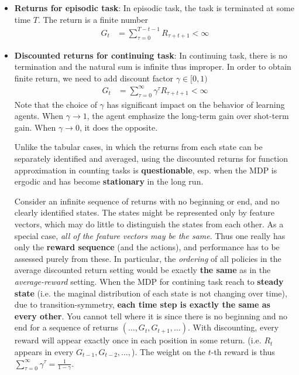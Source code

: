\documentclass[11pt]{article}
\begin{document}
\begin{itemize}
\item \textbf{Returns for episodic task}: In episodic task, the task is terminated at some time $T$. The return is a finite number
\begin{align}
G_{t} &= \sum_{\tau=0}^{T-t-1}R_{\tau+t+1} < \infty \label{eqn: returns_episodic}
\end{align}

\item \textbf{Discounted returns for continuing task}: In continuing task, there is no termination and the natural sum is infinite thus improper. In order to obtain finite return, we need to add discount factor $\gamma \in [0, 1)$
\begin{align}
G_{t} &= \sum_{\tau=0}^{\infty}\gamma^{\tau} R_{\tau+t+1} < \infty \label{eqn: returns_discount_continuing}
\end{align} Note that the choice of $\gamma$ has significant impact on the behavior of learning agents. When $\gamma \rightarrow 1$, the agent emphasize the long-term gain over shot-term gain. When $\gamma \rightarrow 0$, it does the opposite.  

Unlike the tabular cases, in which the returns from each state can be separately identified and averaged, using the discounted returns for function approximation in counting tasks is \textbf{questionable}, esp. when the MDP is ergodic and has become \textbf{stationary} in the long run. 

Consider an infinite sequence of returns with no beginning or end, and no clearly identified states. The states might be represented only by feature vectors, which
may do little to distinguish the states from each other. As a special case, \emph{all of the feature vectors may be the same}. Thus one really has only the \textbf{reward sequence} (and the actions), and performance has to be assessed purely from these. In particular, the \emph{ordering} of all policies in the average discounted return setting
would be exactly \textbf{the same} as in the \emph{average-reward} setting. When the MDP for contining task reach to \textbf{steady state} (i.e. the maginal distribution of each state is not changing over time), due to transition-symmetry, \textbf{each time step is exactly the same as every other}. You cannot tell where it is since there is no beginning and no end for a sequence of returns $(\ldots, G_{t}, G_{t+1}, \ldots)$.  With discounting, every reward will appear exactly once in each position in some return. (i.e. $R_{t}$ appears in every $G_{t-1}, G_{t-2}, \ldots, $). The weight on the $t$-th reward is thus $\sum_{\tau=0}^{\infty}\gamma^{\tau} = \frac{1}{1-\gamma}$.


\end{itemize}
\end{document}
